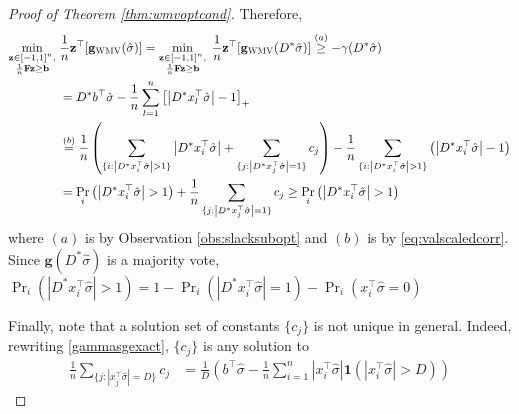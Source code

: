 \documentclass{colt2015} %
\newcommand{\vF}{\mathbf{F}}
\newcommand{\vb}{\mathbf{b}}
\newcommand{\vg}{\mathbf{g}}
\newcommand{\vz}{\mathbf{z}}
\DeclareMathOperator{\Prtxt}{Pr}
\newcommand{\ifn}{\mathbf{1}} %
\newcommand{\abs}[1]{\left| #1 \right|}
\newcommand{\prp}[2]{\Prtxt_{#2} \left(#1\right)}
\newcommand{\wmv}{\textsc{WMV}}
\newcommand{\sighat}{\hat{\sigma}}
\newcommand{\lrp}[1]{\left(#1\right)}
\begin{document}
\begin{proof}[Proof of Theorem \ref{thm:wmvoptcond}]
Therefore, 
\begin{align*}
\min_{\substack{ \vz \in [-1,1]^n , \\ \frac{1}{n} \vF \vz \geq \vb }} \;
&\frac{1}{n} \vz^\top [\vg_{\wmv} (\sighat)] 
= \min_{\substack{ \vz \in [-1,1]^n , \\ \frac{1}{n} \vF \vz \geq \vb }} \;\frac{1}{n} \vz^\top [\vg_{\wmv} (D^* \sighat)] 
\stackrel{(a)}{\geq} - \gamma (D^* \sighat) \\
&= D^* b^\top \sighat - \frac{1}{n} \sum_{l=1}^n \left[ \abs{D^* x_{l}^\top \sighat} - 1 \right]_{+} \\
&\stackrel{(b)}{=} \frac{1}{n} \lrp{ 
\sum_{\{i : \abs{D^* x_{i}^\top \sighat} > 1 \}} \abs{D^* x_{i}^\top \sighat} 
+ \sum_{\{j : \abs{D^* x_{j}^\top \sighat} = 1 \}} c_j } 
- \frac{1}{n} \sum_{\{i : \abs{D^* x_{i}^\top \sighat} > 1 \}} \lrp{ \abs{D^* x_{i}^\top \sighat} - 1 } \\
&= \prp{\abs{D^* x_{i}^\top \sighat} > 1}{i} + \frac{1}{n} \sum_{\{j : \abs{D^* x_{j}^\top \sighat} = 1 \}} c_j 
\geq \prp{\abs{D^* x_{i}^\top \sighat} > 1}{i}
\end{align*}
where $(a)$ is by Observation \ref{obs:slacksubopt} and 
$(b)$ is by \eqref{eq:valscaledcorr}. 
Since $\vg (D^* \sighat)$ is a majority vote, 
$\prp{\abs{D^* x_{i}^\top \sighat} > 1}{i} = 1 - \prp{\abs{D^* x_{i}^\top \sighat} = 1}{i} - \prp{ x_{i}^\top \sighat = 0}{i}$

Finally, note that a solution set of constants $\{c_j\}$ is not unique in general. 
Indeed, rewriting \eqref{gammasgexact}, $\{c_j\}$ is any solution to 
\begin{align*}
\frac{1}{n} \sum_{\{j : \abs{x_{j}^\top \sighat} = D \}} c_j 
&= \frac{1}{D } \lrp{ b^\top \sighat - \frac{1}{n} \sum_{i=1}^n \abs{x_{i}^\top \sighat} \ifn \lrp{ \abs{x_{i}^\top \sighat} > D } }
\end{align*}
\end{proof}
\fi
\end{document}
